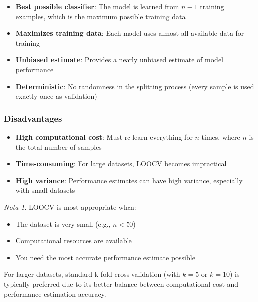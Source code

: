 \documentclass[11pt,a4paper]{article}
\theoremstyle{definition}
\theoremstyle{plain}
\theoremstyle{remark}
\newtheorem*{remark}{Nota}
\begin{document}
\begin{itemize}
    \item \textbf{Best possible classifier}: The model is learned from $n-1$ training examples, which is the maximum possible training data
    
    \item \textbf{Maximizes training data}: Each model uses almost all available data for training
    
    \item \textbf{Unbiased estimate}: Provides a nearly unbiased estimate of model performance
    
    \item \textbf{Deterministic}: No randomness in the splitting process (every sample is used exactly once as validation)
\end{itemize}

\subsubsection{Disadvantages}

\begin{itemize}
    \item \textbf{High computational cost}: Must re-learn everything for $n$ times, where $n$ is the total number of samples
    
    \item \textbf{Time-consuming}: For large datasets, LOOCV becomes impractical
    
    \item \textbf{High variance}: Performance estimates can have high variance, especially with small datasets
\end{itemize}

\begin{remark}
LOOCV is most appropriate when:
\begin{itemize}
    \item The dataset is very small (e.g., $n < 50$)
    \item Computational resources are available
    \item You need the most accurate performance estimate possible
\end{itemize}

For larger datasets, standard k-fold cross validation (with $k = 5$ or $k = 10$) is typically preferred due to its better balance between computational cost and performance estimation accuracy.
\end{remark}
\end{document}
